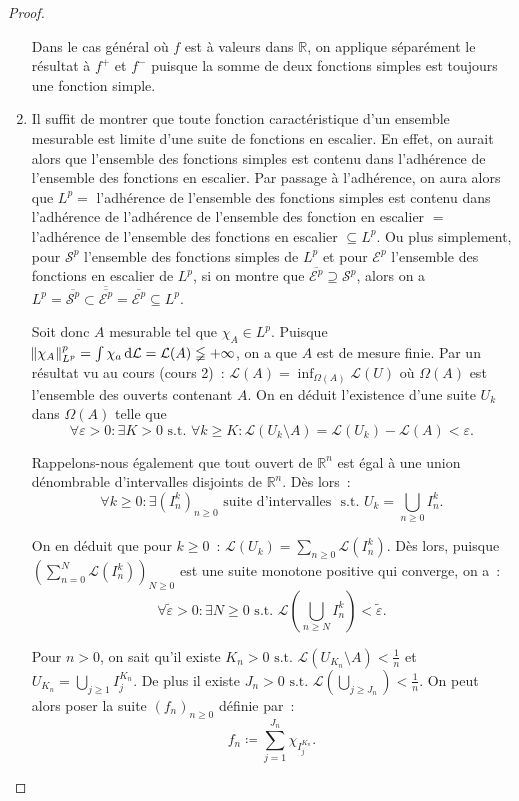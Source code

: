 \documentclass{article}
\newcommand{\pinfty}{{+\infty}}
\newcommand{\st}{\text{ s.t. }}
\newcommand{\R}{{\mathbb R}}
\begin{document}
\begin{proof}
\begin{enumerate}
	Dans le cas général où $f$ est à valeurs dans $\R$, on applique séparément le résultat à $f^+$ et $f^-$ puisque la somme de deux fonctions simples est toujours une fonction simple.

	\item Il suffit de montrer que toute fonction caractéristique d'un ensemble mesurable est limite d'une suite de fonctions en escalier. En effet, on aurait alors que
	l'ensemble des fonctions simples est contenu dans l'adhérence de l'ensemble des fonctions en escalier. Par passage à l'adhérence, on aura alors que $L^p =$ l'adhérence
	de l'ensemble des fonctions simples est contenu dans l'adhérence de l'adhérence de l'ensemble des fonction en escalier $=$ l'adhérence de l'ensemble des fonctions en escalier
	$\subseteq L^p$. Ou plus simplement, pour $\mathcal S^p$ l'ensemble des fonctions simples de $L^p$ et pour $\mathcal E^p$ l'ensemble des fonctions en escalier de $L^p$, si on montre
	que $\overline {\mathcal E^p} \supseteq \mathcal S^p$, alors on a $L^p = \overline {\mathcal S^p} \subset \overline {\overline {\mathcal E^p}}=\overline {\mathcal E^p} \subseteq L^p$.

	Soit donc $A$ mesurable tel que $\chi_A \in L^p$. Puisque $\norm {\chi_A}_{L^p}^p = \int\chi_a\dif\mathcal L = \mathcal L(A) \lneqq \pinfty$, on a que $A$ est de mesure finie.
	Par un résultat vu au cours (cours 2)~: $\mathcal L(A) = \inf_{\Omega(A)}\mathcal L(U)$ où $\Omega(A)$ est l'ensemble des ouverts contenant $A$. On en déduit l'existence d'une
	suite $U_k$ dans $\Omega(A)$ telle que
	\[\forall \varepsilon > 0 : \exists K > 0 \st \forall k \geq K : \mathcal L(U_k \setminus A) = \mathcal L(U_k)-\mathcal L(A) < \varepsilon.\]

	Rappelons-nous également que tout ouvert de $\R^n$ est égal à une union dénombrable d'intervalles disjoints de $\R^n$. Dès lors~:
	\[\forall k \geq 0 : \exists (I^k_n)_{n \geq 0} \text{ suite d'intervalles } \st U_k = \bigcup_{n \geq 0}I^k_n.\]

	On en déduit que pour $k \geq 0$~: $\mathcal L(U_k) = \sum_{n \geq 0}\mathcal L(I^k_n)$. Dès lors, puisque $(\sum_{n=0}^N\mathcal L(I^k_n))_{N \geq 0}$ est une suite monotone
	positive qui converge, on a~:
	\[\forall \tilde \varepsilon > 0 : \exists N \geq 0 \st \mathcal L\left(\bigcup_{n \geq N}I^k_n\right) < \tilde \varepsilon.\]

	Pour $n > 0$, on sait qu'il existe $K_n > 0 \st \mathcal L(U_{K_n} \setminus A) < \frac 1n$ et $U_{K_n} = \bigcup_{j \geq 1}I_j^{K_n}$. De plus il existe
	$J_n > 0 \st \mathcal L(\bigcup_{j \geq J_n}) < \frac 1n$. On peut alors poser la suite $(f_n)_{n \geq 0}$ définie par~:
	\[f_n \coloneqq \sum_{j=1}^{J_n}\chi_{I_j^{K_n}}.\]


\end{enumerate}
\end{proof}
\end{document}
